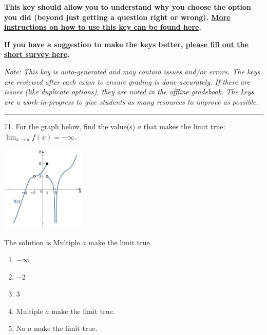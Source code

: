 \documentclass{extbook}[14pt]
\begin{document}
\textbf{This key should allow you to understand why you choose the option you did (beyond just getting a question right or wrong). \href{https://xronos.clas.ufl.edu/mac1105spring2020/courseDescriptionAndMisc/Exams/LearningFromResults}{More instructions on how to use this key can be found here}.}

\textbf{If you have a suggestion to make the keys better, \href{https://forms.gle/CZkbZmPbC9XALEE88}{please fill out the short survey here}.}

\textit{Note: This key is auto-generated and may contain issues and/or errors. The keys are reviewed after each exam to ensure grading is done accurately. If there are issues (like duplicate options), they are noted in the offline gradebook. The keys are a work-in-progress to give students as many resources to improve as possible.}

\rule{\textwidth}{0.4pt}

71. For the graph below, find the value(s) $a$ that makes the limit true: $ \displaystyle \lim_{x \rightarrow a} f(x) = -\infty$.
\begin{center} \includegraphics[width=0.3\textwidth]{../Figures/evaluateLimitGraphicallyA.png} \end{center} 

The solution is $ \text{Multiple } a \text{ make the limit true}. $ 

\begin{enumerate}[label=\Alph*.] 
\item $ -\infty $ 

  
\item $ -2 $ 

  
\item $ 3 $ 

  
\item $ \text{Multiple } a \text{ make the limit true}. $ 

  
\item $ \text{No } a \text{ make the limit true}. $ 

  
\end{enumerate} 
 
\end{document}
